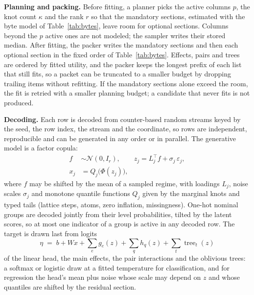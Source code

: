 \documentclass[10pt,letterpaper,twocolumn]{article}
\newcommand{\runin}[1]{\par\smallskip\noindent\textbf{#1.}\hspace{0.45em}\ignorespaces}
\begin{document}
\runin{Planning and packing} Before fitting, a planner picks the active columns $p$, the knot count $\kappa$ and the rank $r$ so that the mandatory sections, estimated with the byte model of Table~\ref{tab:bytes}, leave room for optional sections. Columns beyond the $p$ active ones are not modeled; the sampler writes their stored median. After fitting, the packer writes the mandatory sections and then each optional section in the fixed order of Table~\ref{tab:bytes}. Effects, pairs and trees are ordered by fitted utility, and the packer keeps the longest prefix of each list that still fits, so a packet can be truncated to a smaller budget by dropping trailing items without refitting. If the mandatory sections alone exceed the room, the fit is retried with a smaller planning budget; a candidate that never fits is not produced.

\runin{Decoding} Each row is decoded from counter-based random streams keyed by the seed, the row index, the stream and the coordinate, so rows are independent, reproducible and can be generated in any order or in parallel. The generative model is a factor copula:
\begin{equation}\label{eq:copula}
\begin{aligned}
  f &\sim \mathcal{N}(0, I_r), \qquad z_j = L_j^{\top} f + \sigma_j\,\varepsilon_j,\\
  x_j &= Q_j\bigl(\Phi(z_j)\bigr),
\end{aligned}
\end{equation}
where $f$ may be shifted by the mean of a sampled regime, with loadings $L_j$, noise scales $\sigma_j$ and monotone quantile functions $Q_j$ given by the marginal knots and typed tails (lattice steps, atoms, zero inflation, missingness). One-hot nominal groups are decoded jointly from their level probabilities, tilted by the latent scores, so at most one indicator of a group is active in any decoded row. The target is drawn last from logits
\begin{equation}\label{eq:head}
  \eta \;=\; b + Wx + \sum_{e} g_e(z) + \sum_{q} h_q(z) + \sum_{t}\operatorname{tree}_t(z)
\end{equation}
of the linear head, the main effects, the pair interactions and the oblivious trees: a softmax or logistic draw at a fitted temperature for classification, and for regression the head's mean plus noise whose scale may depend on $z$ and whose quantiles are shifted by the residual section.
\end{document}
